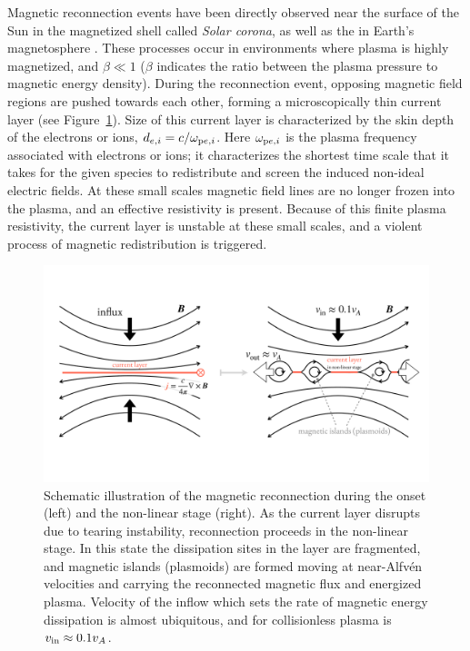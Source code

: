 Magnetic reconnection events have been directly observed near the surface of the Sun in the magnetized shell called \emph{Solar corona}, as well as the in Earth's magnetosphere \citep[for a contemporary review, see, e.g.,][]{2010RvMP...82..603Y}. These processes occur in environments where plasma is highly magnetized, and $\beta\ll 1$ ($\beta$ indicates the ratio between the plasma pressure to magnetic energy density). During the reconnection event, opposing magnetic field regions are pushed towards each other, forming a microscopically thin current layer (see Figure~\ref{fig:intro-rec}). Size of this current layer is characterized by the skin depth of the electrons or ions, $d_{e,i} = c/\omega_{{\rm p}e,i}$. Here $\omega_{{\rm p}e,i}$ is the plasma frequency associated with electrons or ions; it characterizes the shortest time scale that it takes for the given species to redistribute and screen the induced non-ideal electric fields. At these small scales magnetic field lines are no longer frozen into the plasma, and an effective resistivity is present. Because of this finite plasma resistivity, the current layer is unstable at these small scales, and a violent process of magnetic redistribution is triggered.

\begin{figure}[htb]
    \centering
    \includegraphics[width=\textwidth,trim={20 150 20 100},clip]{figures/intro/scheme_reconnection.pdf}
    \caption{Schematic illustration of the magnetic reconnection during the onset (left) and the non-linear stage (right). As the current layer disrupts due to tearing instability, reconnection proceeds in the non-linear stage. In this state the dissipation sites in the layer are fragmented, and magnetic islands (plasmoids) are formed moving at near-Alfv\'en velocities and carrying the reconnected magnetic flux and energized plasma. Velocity of the inflow which sets the rate of magnetic energy dissipation is almost ubiquitous, and for collisionless plasma is $v_{\rm in}\approx 0.1v_{A}$.}
    \label{fig:intro-rec}
\end{figure}


